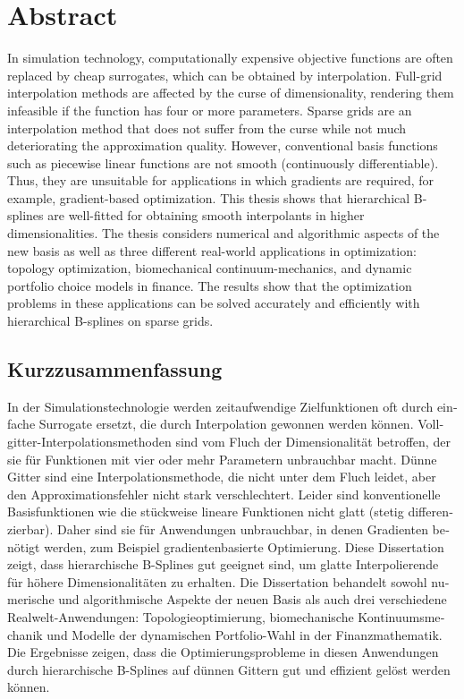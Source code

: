 
\section*{Abstract}

In simulation technology, computationally expensive objective
functions are often replaced
by cheap surrogates, which can be obtained by interpolation.
Full-grid interpolation methods are affected by the curse of dimensionality,
rendering them infeasible if the function has four or more parameters.
Sparse grids are an interpolation method that does not suffer from the
curse while not much deteriorating the approximation quality.
However, conventional basis functions such as piecewise linear functions
are not smooth (continuously differentiable).
Thus, they are unsuitable for applications in which gradients are required,
for example, gradient-based optimization.
This thesis shows that hierarchical B-splines are well-fitted for obtaining
smooth interpolants in higher dimensionalities.
The thesis considers numerical and algorithmic aspects of the new basis
as well as three different real-world applications in optimization:
topology optimization, biomechanical continuum-mechanics, and
dynamic portfolio choice models in finance.
The results show that the optimization problems in these applications
can be solved accurately and efficiently with hierarchical B-splines on sparse grids.

\begin{otherlanguage}{ngerman}
  \section*{Kurzzusammenfassung}
  
  In der Simulationstechnologie werden zeitaufwendige Zielfunktionen
  oft durch einfache Surrogate ersetzt, die durch Interpolation
  gewonnen werden können.
  Vollgitter-Interpolationsmethoden sind vom Fluch der
  Dimensionalität betroffen, der sie für Funktionen mit vier oder mehr
  Parametern unbrauchbar macht.
  Dünne Gitter sind eine Interpolationsmethode, die nicht unter
  dem Fluch leidet, aber den Approximationsfehler nicht stark verschlechtert.
  Leider sind konventionelle Basisfunktionen wie die stückweise
  lineare Funktionen nicht glatt (stetig differenzierbar).
  Daher sind sie für Anwendungen unbrauchbar, in denen Gradienten
  benötigt werden, zum Beispiel gradientenbasierte Optimierung.
  Diese Dissertation zeigt, dass hierarchische B-Splines gut
  geeignet sind, um glatte Interpolierende für höhere
  Dimensionalitäten zu erhalten.
  Die Dissertation behandelt sowohl numerische und algorithmische
  Aspekte der neuen Basis als auch drei verschiedene
  Realwelt-Anwendungen:
  Topologieoptimierung, biomechanische Kontinuumsmechanik und
  Modelle der dynamischen Portfolio-Wahl in der Finanzmathematik.
  Die Ergebnisse zeigen, dass die Optimierungsprobleme in diesen
  Anwendungen durch hierarchische B-Splines auf dünnen Gittern
  gut und effizient gelöst werden können.
\end{otherlanguage}
